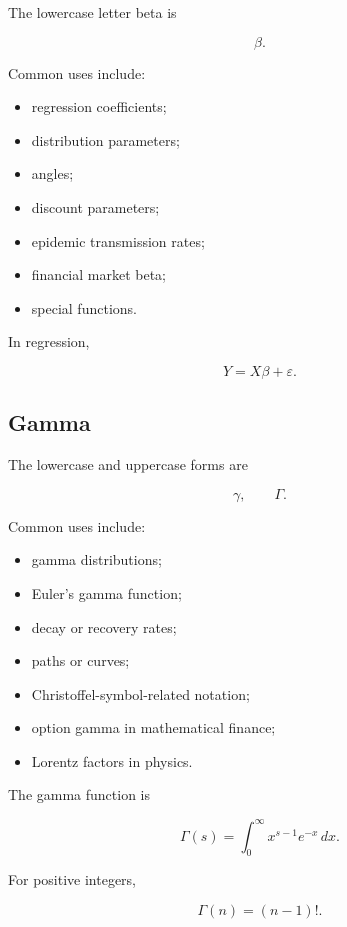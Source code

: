 The lowercase letter beta is

\[
\boxed{
\beta.
}
\]

Common uses include:

\begin{itemize}
    \item regression coefficients;
    \item distribution parameters;
    \item angles;
    \item discount parameters;
    \item epidemic transmission rates;
    \item financial market beta;
    \item special functions.
\end{itemize}

In regression,

\[
\boxed{
Y
=
X\beta+\varepsilon.
}
\]

\subsection{Gamma}
\label{subsec:greek-gamma}

The lowercase and uppercase forms are

\[
\boxed{
\gamma,
\qquad
\Gamma.
}
\]

Common uses include:

\begin{itemize}
    \item gamma distributions;
    \item Euler's gamma function;
    \item decay or recovery rates;
    \item paths or curves;
    \item Christoffel-symbol-related notation;
    \item option gamma in mathematical finance;
    \item Lorentz factors in physics.
\end{itemize}

The gamma function is

\[
\boxed{
\Gamma(s)
=
\int_0^\infty
x^{s-1}e^{-x}\,dx.
}
\]

For positive integers,

\[
\boxed{
\Gamma(n)
=
(n-1)!.
}
\]

